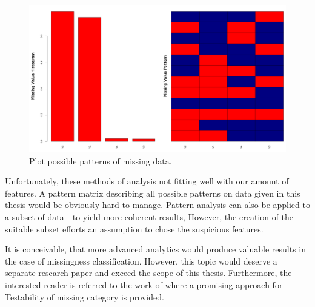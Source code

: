 \begin{figure}[h!]
    \centering
    \includegraphics[scale=0.3]{Graphics/missing-pattern-plot.png}
    \caption{Plot possible patterns of missing data.}
    \label{fig:missing-plot}
\end{figure}

Unfortunately, these methods of analysis not fitting well with our amount of features. A pattern matrix describing all possible patterns on data given in this thesis would be obviously hard to manage. Pattern analysis can also be applied to a subset of data - to yield more coherent results, However, the creation of the suitable subset efforts an assumption to chose the suspicious features.

It is conceivable, that more advanced analytics would produce valuable results in the case of missingness classification. However, this topic would deserve a separate research paper and exceed the scope of this thesis. Furthermore, the interested reader is referred to the work of \cite{Mohan;Pearl:2014} where a promising approach for Testability of missing category is provided.

